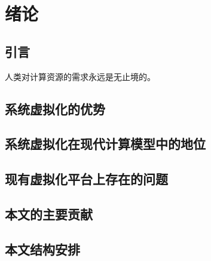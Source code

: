 
\chapter{绪论}
\label{chap:what}

\section{引言}

人类对计算资源的需求永远是无止境的。

\section{系统虚拟化的优势}

\section{系统虚拟化在现代计算模型中的地位}

\section{现有虚拟化平台上存在的问题}

\section{本文的主要贡献}

\section{本文结构安排}




